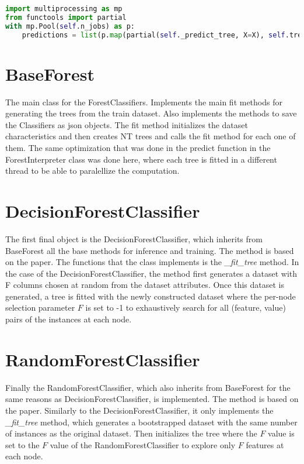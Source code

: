 \begin{lstlisting}[language=Python]
import multiprocessing as mp
from functools import partial
with mp.Pool(self.n_jobs) as p:
    predictions = list(p.map(partial(self._predict_tree, X=X), self.trees))
\end{lstlisting}


\section{BaseForest}

The main class for the ForestClassifiers. Implements the main fit methods for generating the trees from the train dataset. Also implements the methods to save the Classifiers as json objects. 
The fit method initializes the dataset characteristics and then creates NT trees and calls the fit method for each one of them. The same optimization that was done in the predict function in the ForestInterpreter class was done here, where each tree is fitted in a different thread to be able to paralellize the computation.

\section{DecisionForestClassifier}

The first final object is the DecisionForestClassifier, which inherits from BaseForest all the base methods for inference and training. The method is based on the \cite{ho1998random} paper. The functions that the class implements is the \textit{\_fit\_tree} method. In the case of the DecisionForestClassifier, the method first generates a dataset with F columns chosen at random from the dataset attributes. Once this dataset is generated, a tree is fitted with the newly constructed dataset where the per-node selection parameter $F$ is set to -1 to exhaustively search for all (feature, value) pairs of the instances at each node.

\section{RandomForestClassifier}

Finally the RandomForestClassifier, which also inherits from BaseForest for the same reasons as DecisionForestClassifier, is implemented. The method is based on the \cite{breiman2001random} paper.  Similarly to the DecisionForestClassifier, it only implements the \textit{\_fit\_tree} method, which generates a bootstrapped dataset with the same number of instances as the original dataset. Then initializes the tree where the $F$ value is set to the $F$ value of the RandomForestClassifier to explore only $F$ features at each node.
